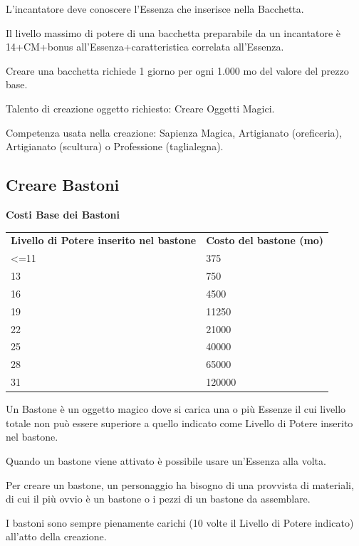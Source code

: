 \documentclass[a4paper,11pt,twoside,openany]{book}
\begin{document}
L'incantatore deve conoscere l'Essenza che inserisce nella Bacchetta.

Il livello massimo di potere di una bacchetta preparabile da un incantatore è 14+CM+bonus all'Essenza+caratteristica correlata all'Essenza.

Creare una bacchetta richiede 1 giorno per ogni 1.000 mo del valore del prezzo base.

Talento di creazione oggetto richiesto: Creare Oggetti Magici.

Competenza usata nella creazione: Sapienza Magica, Artigianato (oreficeria),
Artigianato (scultura) o Professione (taglialegna).

\subsection{Creare Bastoni}

\textbf{Costi Base dei Bastoni}

\bigskip

\begin{tabular}{ll}
	\toprule
	\textbf{Livello di Potere inserito nel bastone} & \textbf{Costo del bastone (mo)}\\
	\textless=11    & 375\\
	13              & 750\\
	16              & 4500\\
	19              & 11250\\
	22              & 21000\\
	25              & 40000\\
	28              & 65000\\
	31              & 120000\\
\end{tabular}

\bigskip

Un Bastone è un oggetto magico dove si carica una o più Essenze il cui livello totale non può essere superiore a quello indicato come Livello di Potere inserito nel bastone.

Quando un bastone viene attivato è possibile usare un'Essenza alla volta.

Per creare un bastone, un personaggio ha bisogno di una provvista di materiali, di cui il più ovvio è un bastone o i pezzi di un bastone da assemblare.

I bastoni sono sempre pienamente carichi (10 volte il Livello di Potere indicato) all'atto della creazione.
\end{document}
